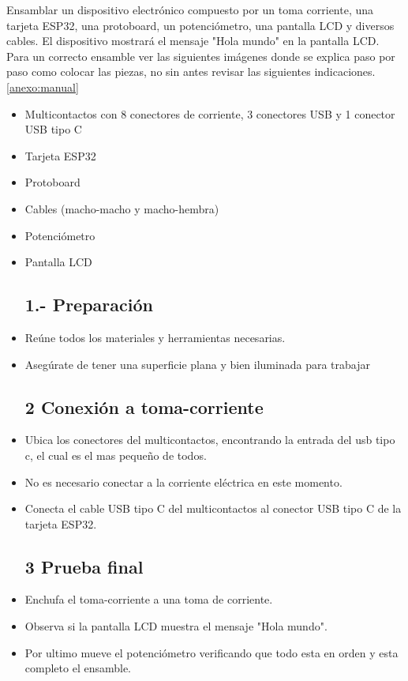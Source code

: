     Ensamblar un dispositivo electrónico compuesto por un toma corriente, una tarjeta ESP32, una protoboard, un potenciómetro, una pantalla LCD y diversos cables. El dispositivo mostrará el mensaje "Hola mundo" en la pantalla LCD.
    Para un correcto ensamble ver las siguientes imágenes donde se explica paso por paso como colocar las piezas, no sin antes revisar las siguientes indicaciones.\ref{anexo:manual} 
    \begin{itemize}
        \subsection{Herramientas y materiales}
        
        \item Multicontactos con 8 conectores de corriente, 3 conectores USB y 1 conector USB tipo C
        \item Tarjeta ESP32
        \item Protoboard
        \item Cables (macho-macho y macho-hembra)
        \item Potenciómetro
        \item Pantalla LCD  
    
        \subsection{1.- Preparación }
        \item Reúne todos los materiales y herramientas necesarias.
        \item Asegúrate de tener una superficie plana y bien iluminada para trabajar
    
        \subsection{2 Conexión a toma-corriente }
        \item Ubica los conectores del multicontactos, encontrando la entrada del usb tipo c, el cual es el mas pequeño de todos.
        \item No es necesario conectar a la corriente eléctrica en este momento.
        \item Conecta el cable USB tipo C del multicontactos al conector USB tipo C de la tarjeta ESP32.
         
         \subsection{3 Prueba final }
        \item Enchufa el toma-corriente a una toma de corriente.
        \item Observa si la pantalla LCD muestra el mensaje "Hola mundo".
        \item Por ultimo mueve el potenciómetro verificando que todo esta en orden y esta completo el ensamble.
    

\end{itemize}
